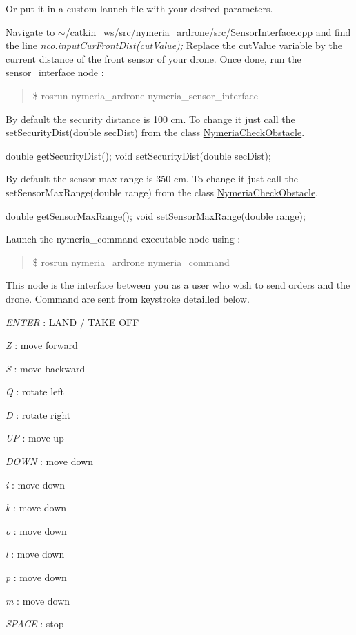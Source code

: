 Or put it in a custom launch file with your desired parameters.

Navigate to $\sim$/catkin\+\_\+ws/src/nymeria\+\_\+ardrone/src/\+Sensor\+Interface.cpp and find the line {\itshape nco.\+input\+Cur\+Front\+Dist(cut\+Value);} Replace the \textquotesingle{}cut\+Value\textquotesingle{} variable by the current distance of the front sensor of your drone. Once done, run the sensor\+\_\+interface node \+: \begin{quote}
\$ rosrun nymeria\+\_\+ardrone nymeria\+\_\+sensor\+\_\+interface \end{quote}


By default the security distance is 100 cm. To change it just call the set\+Security\+Dist(double sec\+Dist) from the class \hyperlink{class_nymeria_check_obstacle}{Nymeria\+Check\+Obstacle}. 
\begin{DoxyCode}
\textcolor{keywordtype}{double} getSecurityDist();
\textcolor{keywordtype}{void} setSecurityDist(\textcolor{keywordtype}{double} secDist);
\end{DoxyCode}


By default the sensor max range is 350 cm. To change it just call the set\+Sensor\+Max\+Range(double range) from the class \hyperlink{class_nymeria_check_obstacle}{Nymeria\+Check\+Obstacle}. 
\begin{DoxyCode}
\textcolor{keywordtype}{double} getSensorMaxRange();
\textcolor{keywordtype}{void} setSensorMaxRange(\textcolor{keywordtype}{double} range);
\end{DoxyCode}


Launch the nymeria\+\_\+command executable node using \+: \begin{quote}
\$ rosrun nymeria\+\_\+ardrone nymeria\+\_\+command \end{quote}


This node is the interface between you as a user who wish to send orders and the drone. Command are sent from keystroke detailled below.
\begin{DoxyItemize}
\item {\itshape E\+N\+T\+E\+R} \+: L\+A\+N\+D / T\+A\+K\+E O\+F\+F
\item {\itshape Z} \+: move forward
\item {\itshape S} \+: move backward
\item {\itshape Q} \+: rotate left
\item {\itshape D} \+: rotate right
\item {\itshape U\+P} \+: move up
\item {\itshape D\+O\+W\+N} \+: move down
\item {\itshape i} \+: move down
\item {\itshape k} \+: move down
\item {\itshape o} \+: move down
\item {\itshape l} \+: move down
\item {\itshape p} \+: move down
\item {\itshape m} \+: move down
\item {\itshape S\+P\+A\+C\+E} \+: stop
\end{DoxyItemize}

